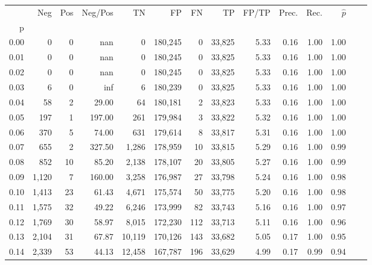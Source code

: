 \begin{tabular}{rrrrrrrrrrrrrr}
\toprule
{} &    Neg &  Pos & Neg/Pos &       TN &       FP &      FN &      TP & FP/TP & Prec. &  Rec. & $\hat{p}$ \\
p    &        &      &         &          &          &         &         &       &       &       &           \\
\midrule
0.00 &      0 &    0 &     nan &        0 &  180,245 &       0 &  33,825 &  5.33 &  0.16 &  1.00 &      1.00 \\
0.01 &      0 &    0 &     nan &        0 &  180,245 &       0 &  33,825 &  5.33 &  0.16 &  1.00 &      1.00 \\
0.02 &      0 &    0 &     nan &        0 &  180,245 &       0 &  33,825 &  5.33 &  0.16 &  1.00 &      1.00 \\
0.03 &      6 &    0 &     inf &        6 &  180,239 &       0 &  33,825 &  5.33 &  0.16 &  1.00 &      1.00 \\
0.04 &     58 &    2 &   29.00 &       64 &  180,181 &       2 &  33,823 &  5.33 &  0.16 &  1.00 &      1.00 \\
0.05 &    197 &    1 &  197.00 &      261 &  179,984 &       3 &  33,822 &  5.32 &  0.16 &  1.00 &      1.00 \\
0.06 &    370 &    5 &   74.00 &      631 &  179,614 &       8 &  33,817 &  5.31 &  0.16 &  1.00 &      1.00 \\
0.07 &    655 &    2 &  327.50 &    1,286 &  178,959 &      10 &  33,815 &  5.29 &  0.16 &  1.00 &      0.99 \\
0.08 &    852 &   10 &   85.20 &    2,138 &  178,107 &      20 &  33,805 &  5.27 &  0.16 &  1.00 &      0.99 \\
0.09 &  1,120 &    7 &  160.00 &    3,258 &  176,987 &      27 &  33,798 &  5.24 &  0.16 &  1.00 &      0.98 \\
0.10 &  1,413 &   23 &   61.43 &    4,671 &  175,574 &      50 &  33,775 &  5.20 &  0.16 &  1.00 &      0.98 \\
0.11 &  1,575 &   32 &   49.22 &    6,246 &  173,999 &      82 &  33,743 &  5.16 &  0.16 &  1.00 &      0.97 \\
0.12 &  1,769 &   30 &   58.97 &    8,015 &  172,230 &     112 &  33,713 &  5.11 &  0.16 &  1.00 &      0.96 \\
0.13 &  2,104 &   31 &   67.87 &   10,119 &  170,126 &     143 &  33,682 &  5.05 &  0.17 &  1.00 &      0.95 \\
0.14 &  2,339 &   53 &   44.13 &   12,458 &  167,787 &     196 &  33,629 &  4.99 &  0.17 &  0.99 &      0.94 \\

\end{tabular}
